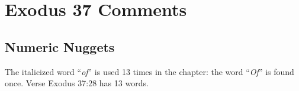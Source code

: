 \section{Exodus 37 Comments}

\subsection{Numeric Nuggets}
The italicized word ``\emph{of}'' is used 13 times in the chapter: the word ``\emph{Of}'' is found once. Verse Exodus 37:28 has 13 words.


